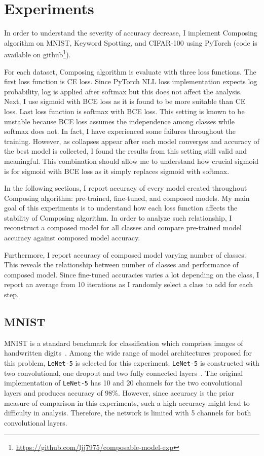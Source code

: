\documentclass{article}
\begin{document}
\section{Experiments}

In order to understand the severity of accuracy decrease, I implement Composing algorithm on MNIST, Keyword Spotting, and CIFAR-100 using PyTorch (code is available on github\footnote{\url{https://github.com/ljj7975/composable-model-exp}}).

For each dataset, Composing algorithm is evaluate with three loss functions. The first loss function is CE loss. Since PyTorch NLL loss implementation expects log probability, log is applied after softmax but this does not affect the analysis. Next, I use sigmoid with BCE loss as it is found to be more suitable than CE loss. Last loss function is softmax with BCE loss. This setting is known to be unstable because BCE loss assumes the independence among classes while softmax does not. In fact, I have experienced some failures throughout the training. However, as collapses appear after each model converges and accuracy of the best model is collected, I found the results from this setting still valid and meaningful. This combination should allow me to understand how crucial sigmoid is for sigmoid with BCE loss as it simply replaces sigmoid with softmax.

In the following sections, I report accuracy of every model created throughout Composing algorithm: pre-trained, fine-tuned, and composed models. My main goal of this experiments is to understand how each loss function affects the stability of Composing algorithm. In order to analyze such relationship, I reconstruct a composed model for all classes and compare pre-trained model accuracy against composed model accuracy.

Furthermore, I report accuracy of composed model varying number of classes. This reveals the relationship between number of classes and performance of composed model. Since fine-tuned accuracies varies a lot depending on the class, I report an average from 10 iterations as I randomly select a class to add for each step.

\subsection{MNIST}

MNIST is a standard benchmark for classification which comprises images of handwritten digits~\cite{lecun1998gradient}. Among the wide range of model architectures proposed for this problem, \texttt{LeNet-5} is selected for this experiment. \texttt{LeNet-5} is constructed with two convolutional, one dropout and two fully connected layers~\cite{lecun2015lenet}. The original implementation of \texttt{LeNet-5} has 10 and 20 channels for the two convolutional layers and produces accuracy of 98\%. However, since accuracy is the prior measure of comparison in this experiments, such a high accuracy might lead to difficulty in analysis. Therefore, the network is limited with 5 channels for both convolutional layers.
\end{document}
